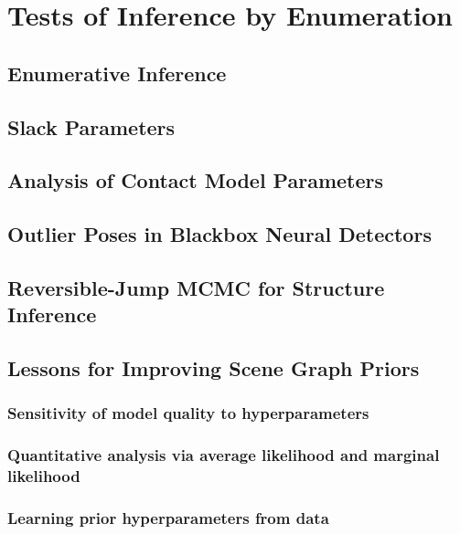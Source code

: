 \chapter{Tests of Inference by Enumeration}

\section{Enumerative Inference}


\section{Slack Parameters}


\section{Analysis of Contact Model Parameters}


\section{Outlier Poses in Blackbox Neural Detectors}


\section{Reversible-Jump MCMC for Structure Inference}


\section{Lessons for Improving Scene Graph Priors}

\subsection{Sensitivity of model quality to hyperparameters}

\subsection{Quantitative analysis via average likelihood and marginal likelihood}

\subsection{Learning prior hyperparameters from data}
